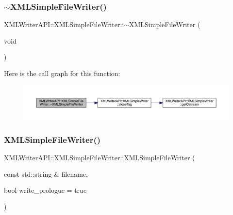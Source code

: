 \subsubsection{\texorpdfstring{$\sim$XMLSimpleFileWriter()}{~XMLSimpleFileWriter()}\hspace{0.1cm}{\footnotesize\ttfamily [2/3]}}
{\footnotesize\ttfamily X\+M\+L\+Writer\+A\+P\+I\+::\+X\+M\+L\+Simple\+File\+Writer\+::$\sim$\+X\+M\+L\+Simple\+File\+Writer (\begin{DoxyParamCaption}\item[{void}]{ }\end{DoxyParamCaption})\hspace{0.3cm}{\ttfamily [inline]}}

Here is the call graph for this function\+:
\nopagebreak
\begin{figure}[H]
\begin{center}
\leavevmode
\includegraphics[width=350pt]{d2/de2/classXMLWriterAPI_1_1XMLSimpleFileWriter_a8a18cf3ea74f63a4f84a434237109e68_cgraph}
\end{center}
\end{figure}
\mbox{\label{classXMLWriterAPI_1_1XMLSimpleFileWriter_a8ce4f6691f7e2e803a14e0cba906a4b7}} 
\subsubsection{\texorpdfstring{XMLSimpleFileWriter()}{XMLSimpleFileWriter()}\hspace{0.1cm}{\footnotesize\ttfamily [3/3]}}
{\footnotesize\ttfamily X\+M\+L\+Writer\+A\+P\+I\+::\+X\+M\+L\+Simple\+File\+Writer\+::\+X\+M\+L\+Simple\+File\+Writer (\begin{DoxyParamCaption}\item[{const std\+::string \&}]{filename,  }\item[{bool}]{write\+\_\+prologue = {\ttfamily true} }\end{DoxyParamCaption})\hspace{0.3cm}{\ttfamily [inline]}}

